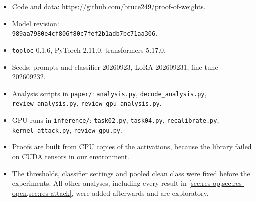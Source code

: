 \documentclass[11pt]{article}
\begin{document}
{\sloppy
\begin{itemize}
  \item Code and data: \url{https://github.com/bruce249/proof-of-weights}.
  \item Model revision:\\ {\footnotesize\texttt{989aa7980e4cf806f80c7fef2b1adb7bc71aa306}}.
  \item \texttt{toploc} 0.1.6, PyTorch 2.11.0, transformers 5.17.0.
  \item Seeds: prompts and classifier 20260923, LoRA 202609231, fine-tune 202609232.
  \item Analysis scripts in \texttt{paper/}: \texttt{analysis.py}, \texttt{decode\_analysis.py}, \texttt{review\_analysis.py}, \texttt{review\_gpu\_analysis.py}.
  \item GPU runs in \texttt{inference/}: \texttt{task02.py}, \texttt{task04.py}, \texttt{recalibrate.py}, \texttt{kernel\_attack.py}, \texttt{review\_gpu.py}.
  \item Proofs are built from CPU copies of the activations, because the library failed on CUDA tensors in our environment.
  \item The thresholds, classifier settings and pooled clean class were fixed before the experiments. All other analyses, including every result in \cref{sec:res-op,sec:res-open,sec:res-attack}, were added afterwards and are exploratory.
\end{itemize}
\par}
\end{document}
